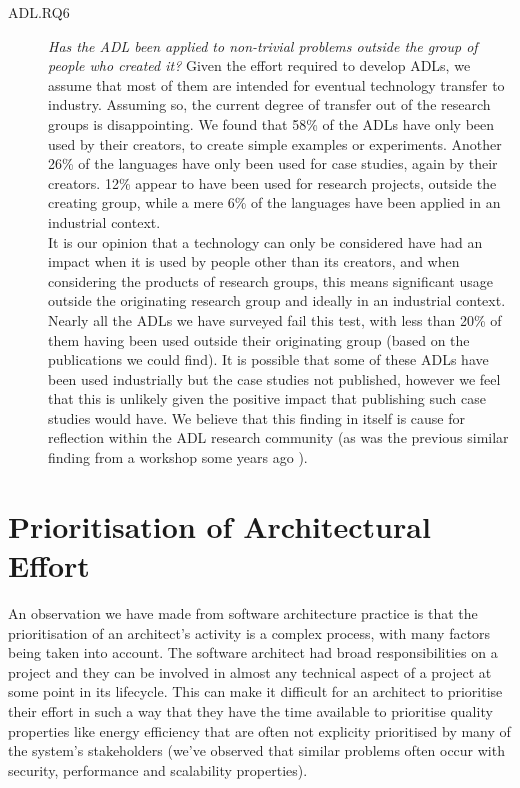 \begin{description}
\item[ADL.RQ6] \emph{Has the ADL been applied to non-trivial problems outside the group of people who created it?}
Given the effort required to develop ADLs, we assume that most of them are intended for eventual technology transfer to industry.  Assuming so, the current degree of transfer out of the research groups is disappointing.  We found that 58\% of the ADLs have only been used by their creators, to create simple examples or experiments.  Another 26\% of the languages have only been used for case studies, again by their creators.  12\% appear to have been used for research projects, outside the creating group, while a mere 6\% of the languages have been applied in an industrial context. \\
It is our opinion that a technology can only be considered have had an impact when it is used by people other than its creators, and when considering the products of research groups, this means significant usage outside the originating research group and ideally in an industrial context.  Nearly all the ADLs we have surveyed fail this test, with less than 20\% of them having been used outside their originating group (based on the publications we could find).  It is possible that some of these ADLs have been used industrially but the case studies not published, however we feel that this is unlikely given the positive impact that publishing such case studies would have.  We believe that this finding in itself is cause for reflection within the ADL research community (as was the previous similar finding from a workshop some years ago \cite{woodshilliard2005-adlsinpractice}).
\end{description}

\section{Prioritisation of Architectural Effort}
\label{section:litreview-prioritisation}

An observation we have made from software architecture practice is that the prioritisation of an architect's activity is a complex process, with many factors being taken into account. The software architect had broad responsibilities on a project and they can be involved in almost any technical aspect of a project at some point in its lifecycle. This can make it difficult for an architect to prioritise their effort in such a way that they have the time available to prioritise quality properties like energy efficiency that are often not explicity prioritised by many of the system's stakeholders (we've observed that similar problems often occur with security, performance and scalability properties).


